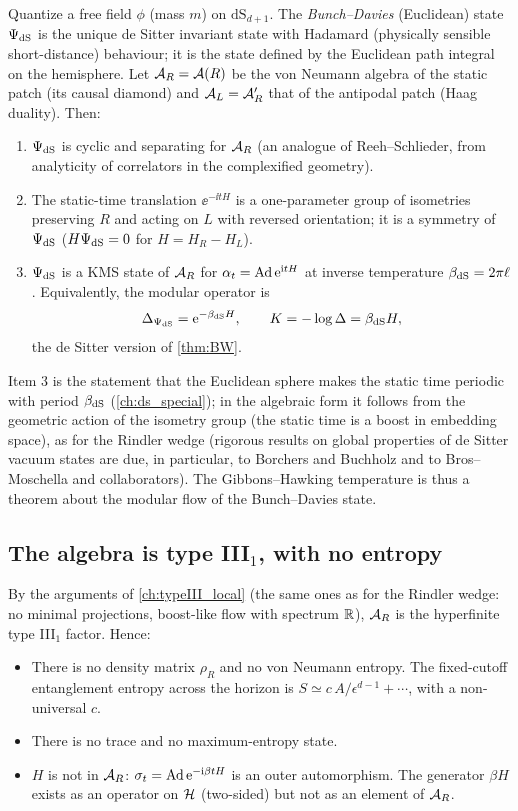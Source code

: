 Quantize a free field $\phi$ (mass $m$) on $\mathrm{dS}_{d+1}$. The \emph{Bunch--Davies} (Euclidean) state $\Psi_{\rm dS}$ is the unique de Sitter invariant state with Hadamard (physically sensible short-distance) behaviour; it is the state defined by the Euclidean path integral on the hemisphere. Let $\mathcal{A}_R=\mathcal{A}(R)$ be the von Neumann algebra of the static patch (its causal diamond) and $\mathcal{A}_L=\mathcal{A}_R'$ that of the antipodal patch (Haag duality). Then:
\begin{enumerate}
\item $\Psi_{\rm dS}$ is cyclic and separating for $\mathcal{A}_R$ (an analogue of Reeh--Schlieder, from analyticity of correlators in the complexified geometry).
\item The static-time translation $\ee^{-\ii tH}$ is a one-parameter group of isometries preserving $R$ and acting on $L$ with reversed orientation; it is a symmetry of $\Psi_{\rm dS}$ ($H\Psi_{\rm dS}=0$ for $H=H_R-H_L$).
\item $\Psi_{\rm dS}$ is a KMS state of $\mathcal{A}_R$ for $\alpha_t=\operatorname{Ad}\mathrm{e}^{\mathrm{i} tH}$ at inverse temperature $\beta_{\rm dS}=2\pi\ell$. Equivalently, the modular operator is
\begin{equation}
\Delta_{\Psi_{\rm dS}}=\mathrm{e}^{-\beta_{\rm dS}H},\qquad K=-\log\Delta=\beta_{\rm dS}H,
\end{equation}
the de Sitter version of \cref{thm:BW}.
\end{enumerate}
Item 3 is the statement that the Euclidean sphere makes the static time periodic with period $\beta_{\rm dS}$ (\cref{ch:ds_special}); in the algebraic form it follows from the geometric action of the isometry group (the static time is a boost in embedding space), as for the Rindler wedge (rigorous results on global properties of de Sitter vacuum states are due, in particular, to Borchers and Buchholz \cite{BorchersBuchholz1999} and to Bros--Moschella and collaborators). The Gibbons--Hawking temperature is thus a theorem about the modular flow of the Bunch--Davies state.

\subsection{The algebra is type III$_1$, with no entropy}

By the arguments of \cref{ch:typeIII_local} (the same ones as for the Rindler wedge: no minimal projections, boost-like flow with spectrum $\mathbb{R}$), $\mathcal{A}_R$ is the hyperfinite type III$_1$ factor. Hence:
\begin{itemize}
\item There is no density matrix $\rho_R$ and no von Neumann entropy. The fixed-cutoff entanglement entropy across the horizon is $S\simeq c\,A/\epsilon^{d-1}+\cdots$, with a non-universal $c$.
\item There is no trace and no maximum-entropy state.
\item $H$ is not in $\mathcal{A}_R$: $\sigma_t=\operatorname{Ad}\mathrm{e}^{-\mathrm{i}\beta tH}$ is an outer automorphism. The generator $\beta H$ exists as an operator on $\mathcal{H}$ (two-sided) but not as an element of $\mathcal{A}_R$.
\end{itemize}


